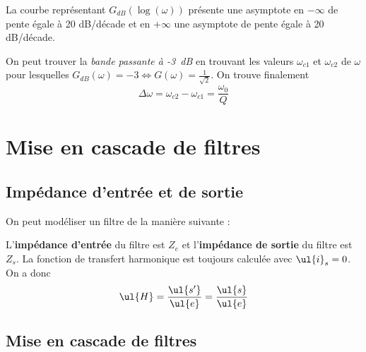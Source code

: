 \documentclass{cours}
\begin{document}
La courbe représentant $G_{dB}(\log(\omega))$ présente une asymptote en $-\infty$ de pente égale à 20 dB/décade et en $+\infty$ une asymptote de pente égale à 20 dB/décade.

On peut trouver la \emph{bande passante à -3~dB} en trouvant les valeurs $\omega_{c1}$ et $\omega_{c2}$ de $\omega$ pour lesquelles $G_{dB}(\omega)=-3 \Leftrightarrow G(\omega)=\frac{1}{\sqrt{2}}$. On trouve finalement
\begin{equation*}
\Delta\omega = \omega_{c2}-\omega_{c1} = \frac{\omega_0}{Q}
\end{equation*} 

\section{Mise en cascade de filtres}%
\label{sec:mise_en_cascade_de_filtres}

\subsection{Impédance d'entrée et de sortie}%
\label{sub:impedance_d_entree_et_de_sortie}

On peut modéliser un filtre de la manière suivante :

\begin{center}
\end{center}

L'\textbf{impédance d'entrée} du filtre est $Z_e$ et l'\textbf{impédance de sortie} du filtre est $Z_s$. La fonction de transfert harmonique est toujours calculée avec $\ul{i}_s=0$.  On a donc 
\begin{equation}
  \ul{H} = \frac{\ul{s'}}{\ul{e}} = \frac{\ul{s}}{\ul{e}}
\end{equation}

\subsection{Mise en cascade de filtres}%
\label{sub:mise_en_cascade_de_filtres}
\end{document}
